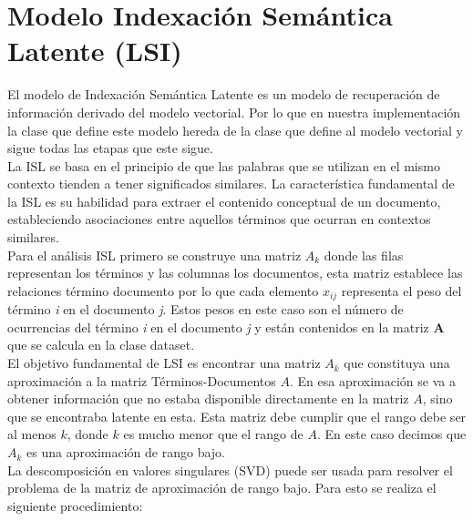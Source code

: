 \documentclass[spanish]{article}
\begin{document}
\section*{ Modelo Indexación Semántica Latente (LSI)}

El modelo de Indexación Semántica Latente es un modelo de recuperación de información derivado del modelo vectorial. Por lo que en nuestra implementación la clase que define este modelo hereda de la clase que define al modelo vectorial y sigue todas las etapas que este sigue.\\

La ISL se basa en el principio de que las palabras que se utilizan en el mismo contexto tienden a tener significados similares. La característica fundamental de la ISL es su habilidad para extraer el contenido conceptual de un documento, estableciendo asociaciones entre aquellos términos que ocurran en contextos similares. \\

Para el análisis ISL primero se construye una matriz ${\displaystyle A_{k}}$ donde las filas representan los términos y las columnas los documentos, esta matriz establece las relaciones término documento por lo que cada elemento  $x_{ij}$  representa el peso del término \textit{i} en el documento \textit{j}. Estos pesos en este caso son el número de ocurrencias del término \textit{i} en el documento \textit{j} y están contenidos en la matriz \textbf{A} que se calcula en la clase dataset.\\

El objetivo fundamental de LSI es encontrar una matriz ${\displaystyle A_{k}}$ que constituya una aproximación a la matriz Términos-Documentos ${\displaystyle A}$. En esa aproximación se va a obtener información que no estaba disponible directamente en la matriz ${\displaystyle A}$, sino que se encontraba latente en esta. Esta matriz debe cumplir que el rango debe ser al menos ${\displaystyle k}$, donde ${\displaystyle k}$ es mucho menor que el rango de ${\displaystyle A}$. En este caso decimos que ${\displaystyle A_{k}}$ es una aproximación de rango bajo.\\

La descomposición en valores singulares (SVD) puede ser usada para resolver el problema de la matriz de aproximación de rango bajo. Para esto se realiza el siguiente procedimiento:\\
\end{document}
